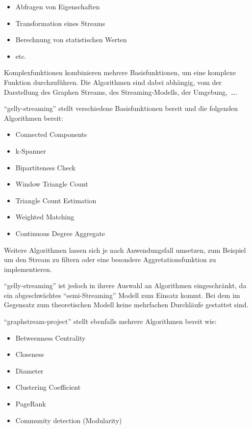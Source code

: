 \begin{itemize}
    \item Abfragen von Eigenschaften
    \item Transformation eines Streams
    \item Berechnung von statistischen Werten
    \item etc.
\end{itemize}

Komplexfunktionen kombinieren mehrere Basisfunktionen, um eine komplexe Funktion
durchzuführen. Die Algorithmen sind dabei abhängig, vom der Darstellung
des Graphen Streams, des Streaming-Modells, der Umgebung,~\dots .

\enquote{gelly-streaming} stellt verschiedene Basisfunktionen bereit und die
folgenden Algorithmen bereit: \cite{Kalavri2018}

\begin{itemize}
    \item Connected Components
    \item k-Spanner
    \item Bipartiteness Check
    \item Window Triangle Count
    \item Triangle Count Estimation
    \item Weighted Matching
    \item Continuous Degree Aggregate
\end{itemize}

Weitere Algorithmen lassen sich je nach Anwendungsfall umsetzen, zum Beispiel um
den Stream zu filtern oder eine besondere Aggretationsfunktion zu implementieren.

\enquote{gelly-streaming} ist jedoch in ihrere Auswahl an Algorithmen eingeschränkt,
da ein abgeschwächtes \enquote{semi-Streaming} Modell zum Einsatz kommt. Bei dem
im Gegensatz zum theoretischen Modell keine mehrfachen Durchläufe gestattet sind.

\enquote{graphstream-project} stellt ebenfalls mehrere Algorithmen bereit wie:

\begin{itemize}
    \item Betweenness Centrality
    \item Closeness
    \item Diameter
    \item Clustering Coefficient
    \item PageRank
    \item Community detection (Modularity)
\end{itemize}

